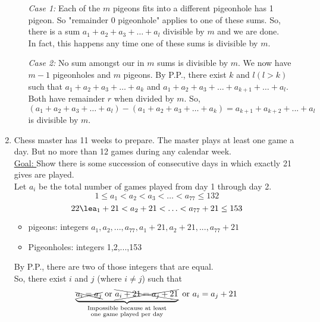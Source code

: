 \documentclass[12pt]{article}
\begin{document}
\begin{enumerate}
    \begin{itemize}
    \item[\sl Case 1:] Each of the $m$ pigeons fits into a different pigeonhole has 1 pigeon. So "remainder 0 pigeonhole" applies to one of these sums. So, there is a sum $a_1+a_2+a_3+\ldots +a_l$  divisible by $m$ and we are done.\\
    
    In fact, this happens any time one of these sums is divisible by $m$. \\
    
    \item[\sl Case 2:] No sum amongst our in $m$ sums is divisible by $m$. We now have $m-1$ pigeonholes and $m$ pigeons. By P.P., there exist $k$ and $l (l>k)$ such that $a_1+a_2+a_3+\ldots +a_k$ and $a_1+a_2+a_3+\ldots +a_{k+1}+\ldots +a_l$. Both have remainder $r$ when divided by $m$. So, $(a_1+a_2+a_3+\ldots +a_l)-(a_1+a_2+a_3+\ldots +a_k) = a_{k+1}+a_{k+2}+...+a_l$ is divisible by $m$. 
    \end{itemize}
    
    \item Chess master has 11 weeks to prepare. The master plays at least one game a day. But no more than 12 games during any calendar week. \\
    
    \underline{Goal: } Show there is some succession of consecutive days in which exactly 21 gives are played.\\
    
    Let $a_i$ be the total number of games played from day 1 through day 2. 
    $$1\le a_1<a_2<a_3<\ldots<a_{77}\le 132$$
    $$22\lea_1+21<a_2+21<\ldots<a_{77}+21\le 153$$
    
    \begin{itemize}
        \item pigeons: integers $a_1,a_2,...,a_{77},a_1+21,a_2+21,...,a_{77}+21$
        \item Pigeonholes: integers 1,2,...,153
    \end{itemize}
    
    By P.P., there are two of those integers that are equal.\\
    
    So, there exist $i$ and $j$ (where $i\neq j$) such that
    $$\underbrace{\xcancel{a_i=a_j}\text{ or }\xcancel{a_i+21=a_j+21}}_{\substack{\text{Impossible because at least}\\ \text{one game played per day}}}\text{ or }a_i=a_j+21$$
    

\end{enumerate}
\end{document}
